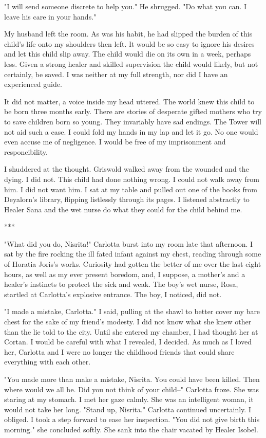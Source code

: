 \documentclass{article}
\begin{document}
"I will send someone discrete to help you." He shrugged. "Do what you can. I leave his care in your hands."

My husband left the room. As was his habit, he had slipped the burden of this child's life onto my shoulders then left. It would be so easy to ignore his desires and let this child slip away. The child would die on its own in a week, perhaps less. Given a strong healer and skilled supervision the child would likely, but not certainly, be saved. I was neither at my full strength, nor did I have an experienced guide. 

It did not matter, a voice inside my head uttered. The world knew this child to be  born three months early. There are stories of desperate gifted mothers who try to save children born so young. They invariably have sad endings. The Tower will not aid such a case. I could fold my hands in my lap and let it go. No one would even accuse me of negligence. I would be free of my imprisonment and responcibility. 

I shuddered at the thought. Griswold walked away from the wounded and the dying. I did not. This child had done nothing wrong. I could not walk away from him. I did not want him. I sat at my table and pulled out one of the books from Deyalorn's library, flipping listlessly through its pages. I listened abstractly to Healer Sana and the wet nurse do what they could for the child behind me.

***

"What did you do, Nisrita!" Carlotta burst into my room late that afternoon. I sat by the fire rocking the ill fated infant against my chest, reading through some of Horatia Joris's works. Curiosity had gotten the better of me over the last eight hours, as well as my ever present boredom, and, I suppose, a mother's and a healer's instincts to protect the sick and weak. The boy's wet nurse, Rosa, startled at Carlotta's explosive entrance. The boy, I noticed, did not. 

"I made a mistake, Carlotta." I said, pulling at the shawl to better cover my bare chest for the sake of my friend's modesty. I did not know what she knew other than the lie told to the city. Until she entered my chamber, I had thought her at Cortan. I would be careful with what I revealed, I decided. As much as I loved her, Carlotta and I were no longer the childhood friends that could share everything with each other.

"You made more than make a mistake, Nisrita. You could have been killed. Then where would we all be. Did you not think of your child--" Carlotta froze. She was staring at my stomach. I met her gaze calmly. She was an intelligent woman, it would not take her long. "Stand up, Nisrita." Carlotta continued uncertainly. I obliged. I took a step forward to ease her inspection. "You did not give birth this morning." she concluded softly. She sank into the chair vacated by Healer Isobel.
\end{document}
